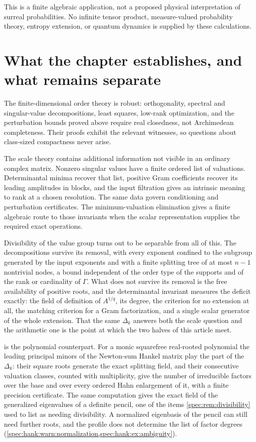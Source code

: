 \documentclass[11pt,a4paper]{article}
\numberwithin{equation}{section}
\theoremstyle{definition}
\theoremstyle{remark}
\begin{document}
This is a finite algebraic application, not a proposed physical
interpretation of surreal probabilities. No infinite tensor product,
measure-valued probability theory, entropy extension, or quantum dynamics
is supplied by these calculations.

\section{What the chapter establishes, and what remains separate}\label{sec:scope}

The finite-dimensional order theory is robust: orthogonality, spectral
and singular-value decompositions, least squares, low-rank optimization,
and the perturbation bounds proved above require real closedness, not
Archimedean completeness. Their proofs exhibit the relevant witnesses, so
questions about class-sized compactness never arise.

The scale theory contains additional information not visible in an ordinary
complex matrix. Nonzero singular values have a finite ordered list of
valuations. Determinantal minima recover that list, positive Gram
coefficients recover its leading amplitudes in blocks, and the input
filtration gives an intrinsic meaning to rank at a chosen resolution.
The same data govern conditioning and perturbation certificates. The
minimum-valuation elimination gives a finite algebraic route to those
invariants when the scalar representation supplies the required exact
operations.

Divisibility of the value group turns out to be separable from all of this.
The decompositions survive its removal, with every exponent confined to the
subgroup generated by the input exponents and with a finite splitting tree
of at most $n-1$ nontrivial nodes, a bound independent of the order type of
the supports and of the rank or cardinality of $\Gamma$. What does not
survive its removal is the free availability of positive roots, and the
determinantal invariant measures the deficit exactly: the field of
definition of $A^{1/q}$, its degree, the criterion for no extension at all,
the matching criterion for a Gram factorization, and a single scalar
generator of the whole extension. That the same $\Delta_k$ answers both the
scale question and the arithmetic one is the point at which the two halves
of this article meet.

 is the polynomial counterpart. For a monic
squarefree real-rooted polynomial the leading principal minors of the
Newton-sum Hankel matrix play the part of the $\Delta_k$: their square roots
generate the exact splitting field, and their consecutive valuation classes,
counted with multiplicity, give the number of irreducible factors over the
base and over every ordered Hahn enlargement of it, with a finite precision
certificate. The same computation gives the exact field of the generalized
eigenvalues of a definite pencil, one of the items
\cref{spec:rem:divisibility} used to list as needing divisibility. A
normalized eigenbasis of the pencil can still need further roots, and the
profile does not determine the list of factor degrees
(\cref{spec:hank:warn:normalization,spec:hank:ex:ambiguity}).
\end{document}
